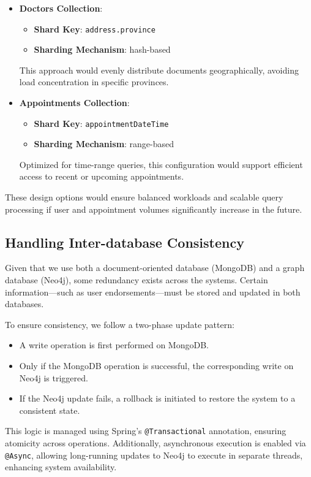 \begin{itemize}
  \item \textbf{Doctors Collection}:
    \begin{itemize}
      \item \textbf{Shard Key}: \texttt{address.province}
      \item \textbf{Sharding Mechanism}: hash-based
    \end{itemize}
    This approach would evenly distribute documents geographically, avoiding load concentration in specific provinces.

  \item \textbf{Appointments Collection}:
    \begin{itemize}
      \item \textbf{Shard Key}: \texttt{appointmentDateTime}
      \item \textbf{Sharding Mechanism}: range-based
    \end{itemize}
    Optimized for time-range queries, this configuration would support efficient access to recent or upcoming appointments.
\end{itemize}

These design options would ensure balanced workloads and scalable query processing if user and appointment volumes significantly increase in the future.

\subsection{Handling Inter-database Consistency}

Given that we use both a document-oriented database (MongoDB) and a graph database (Neo4j), some redundancy exists across the systems. Certain information—such as user endorsements—must be stored and updated in both databases.

To ensure consistency, we follow a two-phase update pattern:
\begin{itemize}
  \item A write operation is first performed on MongoDB.
  \item Only if the MongoDB operation is successful, the corresponding write on Neo4j is triggered.
  \item If the Neo4j update fails, a rollback is initiated to restore the system to a consistent state.
\end{itemize}

This logic is managed using Spring’s \texttt{@Transactional} annotation, ensuring atomicity across operations. Additionally, asynchronous execution is enabled via \texttt{@Async}, allowing long-running updates to Neo4j to execute in separate threads, enhancing system availability.


